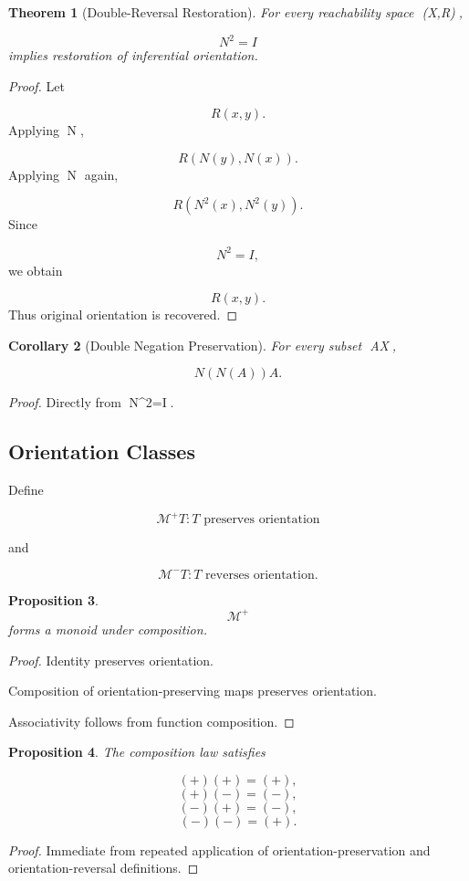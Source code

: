 \documentclass[12pt]{article}
\newtheorem{theorem}{Theorem}[section]
\newtheorem{proposition}[theorem]{Proposition}
\newtheorem{corollary}[theorem]{Corollary}
\theoremstyle{remark}
\begin{document}
\begin{theorem}[Double-Reversal Restoration]
\label{app:double-restoration}
For every reachability space (X,R),

\[
N^2=I
\]
implies restoration of inferential orientation.
\end{theorem}

\begin{proof}
Let

\[
R(x,y).
\]
Applying N,

\[
R(N(y),N(x)).
\]
Applying N again,

\[
R(N^2(x),N^2(y)).
\]
Since

\[
N^2=I,
\]
we obtain

\[
R(x,y).
\]
Thus original orientation is recovered.
\end{proof}

\begin{corollary}[Double Negation Preservation]
For every subset A\subseteq X,

\[
N(N(A))
A.
\]
\end{corollary}

\begin{proof}
Directly from N^2=I.
\end{proof}

\subsection{Orientation Classes}

Define

\[
\mathcal{M}^{+}
{T:T \text{ preserves orientation}}
\]

and

\[
\mathcal{M}^{-}
{T:T \text{ reverses orientation}}.
\]

\begin{proposition}
\[
\mathcal{M}^{+}
\]
forms a monoid under composition.
\end{proposition}

\begin{proof}
Identity preserves orientation.

Composition of orientation-preserving maps preserves orientation.

Associativity follows from function composition.
\end{proof}

\begin{proposition}
The composition law satisfies

\[
(+)(+)=(+),
\]
\[
(+)(-) = (-),
\]
\[
(-)(+) = (-),
\]
\[
(-)(-) = (+).
\]
\end{proposition}
\begin{proof}
Immediate from repeated application of orientation-preservation and orientation-reversal definitions.
\end{proof}
\end{document}
